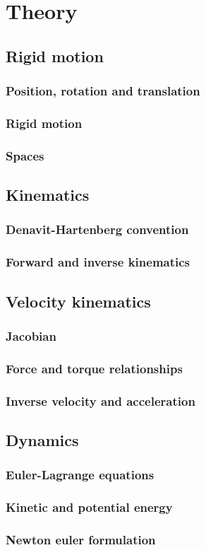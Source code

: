 \chapter{Theory}

\section{Rigid motion}
\lipsum[1]
\subsection{Position, rotation and translation}
\subsection{Rigid motion}
\subsection{Spaces}

\section{Kinematics}
\lipsum[1]
\subsection{Denavit-Hartenberg convention}
\subsection{Forward and inverse kinematics}

\section{Velocity kinematics}
\lipsum[1]
\subsection{Jacobian}
\subsection{Force and torque relationships}
\subsection{Inverse velocity and acceleration}

\section{Dynamics}
\lipsum[1]
\subsection{Euler-Lagrange equations}
\subsection{Kinetic and potential energy}
\subsection{Newton euler formulation}